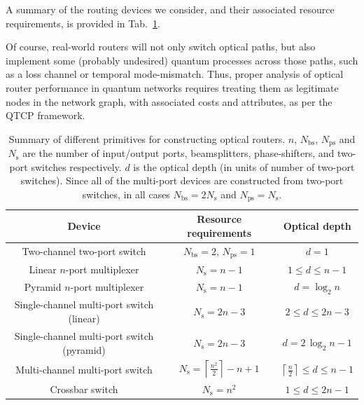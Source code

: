 A summary of the routing devices we consider, and their associated resource requirements, is provided in Tab.~\ref{tab:router_summary}.

Of course, real-world routers will not only switch optical paths, but also implement some (probably undesired) quantum processes across those paths, such as a loss channel or temporal mode-mismatch. Thus, proper analysis of optical router performance in quantum networks requires treating them as legitimate nodes in the network graph, with associated costs and attributes, as per the QTCP framework.

\startnormtable
\begin{table}[!htbp]
	\begin{tabular}{|c|c|c|}
		\hline
  		Device & Resource requirements & Optical depth \\
  		\hline
  		\hline
  		Two-channel two-port switch & \mbox{$N_\mathrm{bs}=2$}, \mbox{$N_\mathrm{ps}=1$} & \mbox{$d=1$} \\
  		Linear $n$-port multiplexer & \mbox{$N_\mathrm{s}=n-1$} & \mbox{$1\leq d\leq n-1$} \\
  		Pyramid $n$-port multiplexer & \mbox{$N_\mathrm{s}=n-1$} & \mbox{$d=\log_2 n$} \\
    	Single-channel multi-port switch (linear) & \mbox{$N_\mathrm{s}=2n-3$} & \mbox{$2\leq d\leq 2n-3$} \\
  		Single-channel multi-port switch (pyramid) & \mbox{$N_\mathrm{s}=2n-3$} & \mbox{$d=2\,\log_2 n-1$} \\
  		Multi-channel multi-port switch & \mbox{$N_\mathrm{s} = \left\lceil \frac{n^2}{2}\right\rceil - n + 1$} & \mbox{$\left\lceil \frac{n}{2} \right\rceil \leq d\leq n-1$} \\
  		Crossbar switch & \mbox{$N_\mathrm{s}=n^2$} & \mbox{$1\leq d\leq 2n-1$}\\
    	\hline
	\end{tabular}
	\captionspacetab \caption{Summary of different primitives for constructing optical routers. $n$, $N_\mathrm{bs}$, $N_\mathrm{ps}$ and $N_\mathrm{s}$ are the number of input/output ports, beamsplitters, phase-shifters, and two-port switches respectively. $d$ is the optical depth (in units of number of two-port switches). Since all of the multi-port devices are constructed from two-port switches, in all cases \mbox{$N_\mathrm{bs} = 2 N_\mathrm{s}$} and \mbox{$N_\mathrm{ps} = N_\mathrm{s}$}.} \label{tab:router_summary} 
\end{table}
\startalgtable


